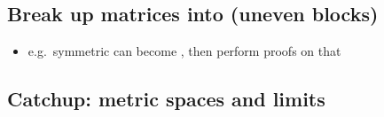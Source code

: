 \subsection*{Break up matrices into (uneven
blocks)}

\begin{itemize}

\item
  e.g.~symmetric  can become
  ,
  then perform proofs on that
\end{itemize}

\subsection*{Catchup: metric spaces and
limits}

